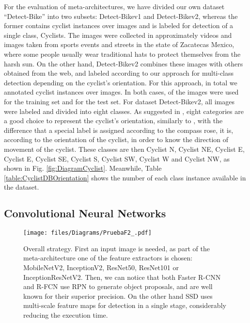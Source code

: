 \documentclass[journal]{IEEEtran}
\begin{document}
For the evaluation of meta-architectures, we have divided our own dataset ``Detect-Bike'' into two subsets: Detect-Bikev1 and Detect-Bikev2, whereas the former contains  cyclist instances over  images and is labeled for detection of a single class, Cyclists. The images were collected in approximately  videos and images taken from sports events and streets in the state of Zacatecas Mexico, where some people usually wear traditional hats to protect themselves from the harsh sun. On the other hand, Detect-Bikev2 combines these images with others obtained from the web, and labeled according to our approach for multi-class detection depending on the cyclist's orientation.  For this approach, in total we annotated  cyclist instances over  images. In both cases,  of the images were used for the training set and  for the test set. For dataset Detect-Bikev2, all images were labeled and divided into eight classes. As suggested in \cite{guindel2018fast}, eight categories are a good choice to represent the cyclist's orientation, similarly to \cite{tian2015bfast}, with the difference that a special label is assigned according to the compass rose, it is, according to the orientation of the cyclist, in order to know the direction of movement of the cyclist. These classes are then Cyclist N, Cyclist NE, Cyclist E, Cyclist E, Cyclist SE, Cyclist S, Cyclist SW, Cyclist W and Cyclist NW, as shown in Fig. \ref{fig:DiagramCyclist}. Meanwhile, Table \ref{table:CyclistDBOrientation} shows the number of each class instance available in the dataset. 


\subsection{Convolutional Neural Networks}
\begin{figure*}[ht!]
\begin{center}
  \texttt{[image: files/Diagrams/PruebaF2\_.pdf]}
\caption{Overall strategy. First an input image is needed, as part of the meta-architecture one of the feature extractors is chosen: MobileNetV2, InceptionV2,  ResNet50, ResNet101 or InceptionResNetV2. Then, we can notice that both Faster R-CNN and R-FCN use RPN to generate object proposals, and are well known for their superior precision. On the other hand SSD uses multi-scale feature maps for detection in a single stage, considerably reducing the execution time.}
\label{fig:DiagramArch}       \end{center}
\end{figure*}
\end{document}
